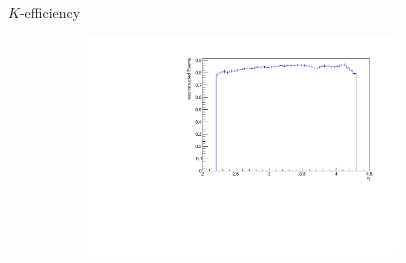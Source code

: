 \documentclass[11pt]{beamer}
\begin{document}
\begin{frame}{$K$-efficiency}
\begin{figure}
\begin{subfigure}{0.45\textwidth}
\end{subfigure}
\begin{subfigure}{0.45\textwidth}
\includegraphics[width=0.9\textwidth]{up_pdf/tot/h_eta_reco_K.pdf}
\end{subfigure}
\end{figure}
\end{frame}
\end{document}
